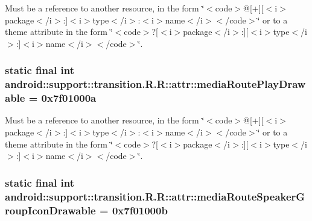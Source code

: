 Must be a reference to another resource, in the form \char`\"{}$<$code$>$@\mbox{[}+\mbox{]}\mbox{[}$<$i$>$package$<$/i$>$:\mbox{]}$<$i$>$type$<$/i$>$:$<$i$>$name$<$/i$>$$<$/code$>$\char`\"{} or to a theme attribute in the form \char`\"{}$<$code$>$?\mbox{[}$<$i$>$package$<$/i$>$:\mbox{]}\mbox{[}$<$i$>$type$<$/i$>$:\mbox{]}$<$i$>$name$<$/i$>$$<$/code$>$\char`\"{}. \hypertarget{classandroid_1_1support_1_1transition_1_1_r_1_1attr_e4801ae0b533fef488419da1fea8efac}{
\subsubsection[{mediaRoutePlayDrawable}]{\setlength{\rightskip}{0pt plus 5cm}static final int android::support::transition.R.R::attr::mediaRoutePlayDrawable = 0x7f01000a}}
\label{classandroid_1_1support_1_1transition_1_1_r_1_1attr_e4801ae0b533fef488419da1fea8efac}


Must be a reference to another resource, in the form \char`\"{}$<$code$>$@\mbox{[}+\mbox{]}\mbox{[}$<$i$>$package$<$/i$>$:\mbox{]}$<$i$>$type$<$/i$>$:$<$i$>$name$<$/i$>$$<$/code$>$\char`\"{} or to a theme attribute in the form \char`\"{}$<$code$>$?\mbox{[}$<$i$>$package$<$/i$>$:\mbox{]}\mbox{[}$<$i$>$type$<$/i$>$:\mbox{]}$<$i$>$name$<$/i$>$$<$/code$>$\char`\"{}. \hypertarget{classandroid_1_1support_1_1transition_1_1_r_1_1attr_33d34188372a574401fabbe5194b0c0b}{
\subsubsection[{mediaRouteSpeakerGroupIconDrawable}]{\setlength{\rightskip}{0pt plus 5cm}static final int android::support::transition.R.R::attr::mediaRouteSpeakerGroupIconDrawable = 0x7f01000b}}
\label{classandroid_1_1support_1_1transition_1_1_r_1_1attr_33d34188372a574401fabbe5194b0c0b}



